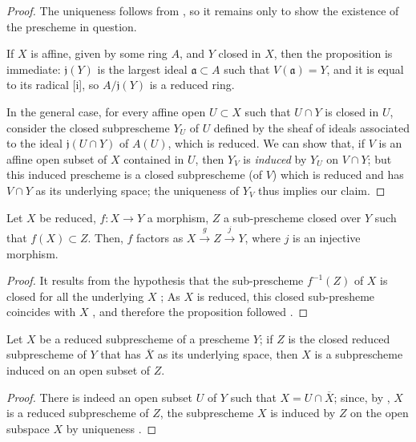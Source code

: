 \begin{proof}
The uniqueness follows from , so it remains only to show the existence of the prescheme in question.

If $X$ is affine, given by some ring $A$, and $Y$ closed in $X$, then the proposition is immediate:
$\mathfrak{j}(Y)$ is the largest ideal $\mathfrak{a}\subset A$ such that $V(\mathfrak{a})=Y$, and it is equal to its radical [i], so $A/\mathfrak{j}(Y)$ is a reduced ring.

In the general case, for every affine open $U\subset X$ such that $U\cap Y$ is closed in $U$, consider the closed subprescheme $Y_U$ of $U$ defined by the sheaf of ideals associated to the ideal $\mathfrak{j}(U\cap Y)$ of $A(U)$, which is reduced.
We can show that, if $V$ is an affine open subset of $X$ contained in $U$, then $Y_V$ is \emph{induced} by $Y_U$ on $V\cap Y$;
but this induced prescheme is a closed subprescheme (of $V$) which is reduced and has $V\cap Y$ as its underlying space;
the uniqueness of $Y_V$ thus implies our claim.
\end{proof}

\begin{proposition}[5.2.2]
\label{I.5.2.2}
Let $X$ be reduced, $f:X \to Y$ a morphism, $Z$ a sub-prescheme closed over $Y$ such that $f(X) \subset Z$.
Then, $f$ factors as $X \xrightarrow{g} Z \xrightarrow{j} Y$, where $j$ is an injective morphism.
\end{proposition}

\begin{proof}
It results from the hypothesis that the sub-prescheme $f^{-1}(Z)$ of $X$ is closed for all the underlying $X$ ;
As $X$ is reduced, this closed sub-presheme coincides with $X$ , and therefore the proposition followed .
\end{proof}

\begin{corollary}[5.2.3]
\label{I.5.2.3}
Let $X$ be a reduced subprescheme of a prescheme $Y$; if $Z$ is the closed reduced subprescheme of $Y$ that has $\overline{X}$ as its underlying space, then $X$ is a subprescheme induced on an open subset of $Z$.
\end{corollary}

\begin{proof}
There is indeed an open subset $U$ of $Y$ such that $X=U\cap\overline{X}$;
since, by , $X$ is a reduced subprescheme of $Z$, the subprescheme $X$ is induced by $Z$ on the open subspace $X$ by uniqueness .
\end{proof}

